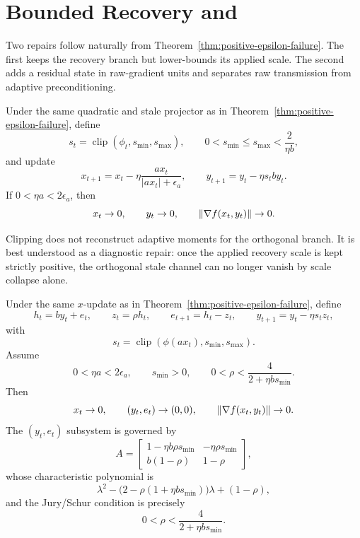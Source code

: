 \section{Bounded Recovery and \BECR}

Two repairs follow naturally from Theorem~\ref{thm:positive-epsilon-failure}.
The first keeps the recovery branch but lower-bounds its applied scale. The
second adds a residual state in raw-gradient units and separates raw
transmission from adaptive preconditioning.

\begin{theorem}
\label{thm:clipping-repair}
Under the same quadratic and stale projector as in
Theorem~\ref{thm:positive-epsilon-failure}, define
\[
s_t = \operatorname{clip}\!\left(\phi_t, s_{\min}, s_{\max}\right),
\qquad
0<s_{\min}\le s_{\max}<\frac{2}{\eta b},
\]
and update
\[
x_{t+1}=x_t-\eta \frac{a x_t}{|a x_t|+\epsilon_a},
\qquad
y_{t+1}=y_t-\eta s_t b y_t.
\]
If $0<\eta a<2\epsilon_a$, then
\[
x_t\to 0,\qquad y_t\to 0,\qquad \left\lVert \nabla f(x_t,y_t) \right\rVert\to 0.
\]
\end{theorem}

Clipping does not reconstruct adaptive moments for the orthogonal branch. It is
best understood as a diagnostic repair: once the applied recovery scale is kept
strictly positive, the orthogonal stale channel can no longer vanish by scale
collapse alone.

\begin{theorem}
\label{thm:becr-repair}
Under the same $x$-update as in
Theorem~\ref{thm:positive-epsilon-failure}, define
\[
h_t = b y_t + e_t,\qquad
z_t = \rho h_t,\qquad
e_{t+1} = h_t - z_t,\qquad
y_{t+1} = y_t - \eta s_t z_t,
\]
with
\[
s_t = \operatorname{clip}\!\left(\phi(a x_t), s_{\min}, s_{\max}\right).
\]
Assume
\[
0 < \eta a < 2\epsilon_a,\qquad
s_{\min}>0,\qquad
0 < \rho < \frac{4}{2+\eta b s_{\min}}.
\]
Then
\[
x_t \to 0,\qquad (y_t,e_t)\to(0,0),\qquad \left\lVert \nabla f(x_t,y_t) \right\rVert\to 0.
\]
The $(y_t,e_t)$ subsystem is governed by
\[
A=
\begin{bmatrix}
1-\eta b \rho s_{\min} & -\eta \rho s_{\min} \\
b(1-\rho) & 1-\rho
\end{bmatrix},
\]
whose characteristic polynomial is
\[
\lambda^2 - \bigl(2-\rho(1+\eta b s_{\min})\bigr)\lambda + (1-\rho),
\]
and the Jury/Schur condition is precisely
\[
0 < \rho < \frac{4}{2+\eta b s_{\min}}.
\]
\end{theorem}

